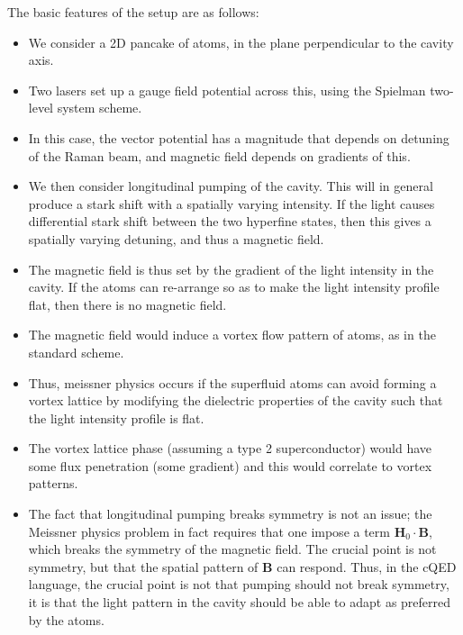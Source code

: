 \documentclass[twocolumn]{revtex4-1}
\renewcommand{\vec}[1]{\mathbf{#1}}
\begin{document}
The basic features of the setup are as follows:
\begin{itemize}
\item We consider a 2D pancake of atoms, in the plane perpendicular to
  the cavity axis.
\item Two lasers set up a gauge field potential across this, using 
  the Spielman two-level system scheme.
\item In this case, the vector potential has a magnitude that depends on
  detuning of the Raman beam, and magnetic field depends on gradients of this.
\item We then consider longitudinal pumping of the cavity.  This will
  in general produce a stark shift with a spatially varying intensity.
  If the light causes differential stark shift between the two
  hyperfine states, then this gives a spatially varying detuning, and thus
  a magnetic field.
\item The magnetic field is thus set by the gradient of the light intensity
  in the cavity.  If the atoms can re-arrange so as to make the light intensity
  profile flat, then there is no magnetic field.
\item The magnetic field would induce a vortex flow pattern of atoms,
  as in the standard scheme.
\item Thus, meissner physics occurs if the superfluid atoms can avoid
  forming a vortex lattice by modifying the dielectric properties of
  the cavity such that the light intensity profile is flat.
\item The vortex lattice phase (assuming a type 2 superconductor) would
  have some flux penetration (some gradient) and this would correlate
  to vortex patterns.
\item The fact that longitudinal pumping breaks symmetry is not an
  issue; the Meissner physics problem in fact requires that one impose
  a term $\vec{H}_{0}\cdot\vec{B}$, which breaks the symmetry of the
  magnetic field.  The crucial point is not symmetry, but that the
  spatial pattern of $\vec{B}$ can respond.  Thus, in the cQED
  language, the crucial point is not that pumping should not break
  symmetry, it is that the light pattern in the cavity should be able
  to adapt as preferred by the atoms.

\end{itemize}
\end{document}
